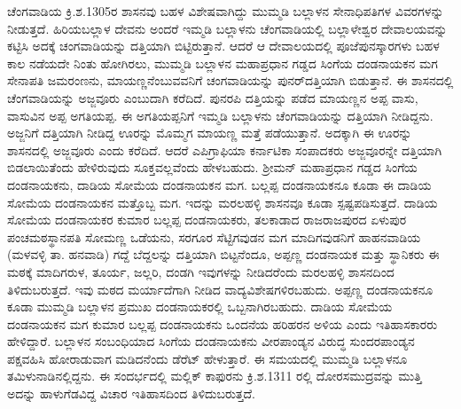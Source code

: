 ಚೆಂಗವಾಡಿಯ ಕ್ರಿ.ಶ.1305ರ ಶಾಸನವು ಬಹಳ ವಿಶೇಷವಾಗಿದ್ದು ಮುಮ್ಮಡಿ ಬಲ್ಲಾಳನ ಸೇನಾಧಿಪತಿಗಳ ವಿವರಗಳನ್ನು ನೀಡುತ್ತದೆ. ಹಿರಿಯಬಲ್ಲಾಳ ದೇವನು ಅಂದರೆ ಇಮ್ಮಡಿ ಬಲ್ಲಾಳನು ಚೆಂಗವಾಡಿಯಲ್ಲಿ ಬಲ್ಲಾಳೇಶ್ವರ ದೇವಾಲಯವನ್ನು ಕಟ್ಟಿಸಿ ಅದಕ್ಕೆ ಚಂಗವಾಡಿಯನ್ನು ದತ್ತಿಯಾಗಿ ಬಿಟ್ಟಿರುತ್ತಾನೆ. ಆದರೆ ಆ ದೇವಾಲಯದಲ್ಲಿ ಪೂಜೆಪುನಸ್ಕಾರಗಳು ಬಹಳ ಕಾಲ ನಡೆಯದೇ ನಿಂತು ಹೋಗಿರಲು, ಮುಮ್ಮಡಿ ಬಲ್ಲಾಳನ ಮಹಾಪ್ರಧಾನ ಗಡ್ಡದ ಸಿಂಗೆಯ ದಂಡನಾಯಕನ ಮಗ ಸೇನಾಪತಿ ಜಮರಂಣನು, ಮಾಯಣ್ಣನೆಂಬುವವನಿಗೆ ಚಂಗವಾಡಿಯನ್ನು ಪುನರ್​ದತ್ತಿಯಾಗಿ ಬಿಡುತ್ತಾನೆ. ಈ ಶಾಸನದಲ್ಲಿ ಚೆಂಗವಾಡಿಯನ್ನು ಅಜ್ಜವೂರು ಎಂಬುದಾಗಿ ಕರೆದಿದೆ. ಪುನರಪಿ ದತ್ತಿಯನ್ನು ಪಡೆದ ಮಾಯಣ್ಣನ ಅಪ್ಪ ವಾಸು, ವಾಸುವಿನ ಅಪ್ಪ ಅಗತಿಯಪ್ಪ. ಈ ಅಗತಿಯಪ್ಪನಿಗೆ ಇಮ್ಮಡಿ ಬಲ್ಲಾಳನು ಚೆಂಗವಾಡಿಯನ್ನು ದತ್ತಿಯಾಗಿ ನೀಡಿದ್ದನು. ಅಜ್ಜನಿಗೆ ದತ್ತಿಯಾಗಿ ನೀಡಿದ್ದ ಊರನ್ನು ಮೊಮ್ಮಗ ಮಾಯಣ್ಣ ಮತ್ತೆ ಪಡೆಯುತ್ತಾನೆ. ಅದಕ್ಕಾಗಿ ಈ ಊರನ್ನು ಶಾಸನದಲ್ಲಿ ಅಜ್ಜವೂರು ಎಂದು ಕರೆದಿದೆ. ಆದರೆ ಎಪಿಗ್ರಾಫಿಯಾ ಕರ್ನಾಟಿಕಾ ಸಂಪಾದಕರು ಅಜ್ಜವೂರನ್ನೇ ದತ್ತಿಯಾಗಿ ಬಿಡಲಾಯಿತೆಂದು ಹೇಳಿರುವುದು ಸೂಕ್ತವಲ್ಲವೆಂದು ಹೇಳಬಹುದು. ಶ‍್ರೀಮನ್​ ಮಹಾಪ್ರಧಾನ ಗಡ್ಡದ ಸಿಂಗೆಯ ದಂಡನಾಯಕನು, ದಾಡಿಯ ಸೋಮೆಯ ದಂಡನಾಯಕನ ಮಗ. ಬಲ್ಲಪ್ಪ ದಂಡನಾಯಕನೂ ಕೂಡಾ ಈ ದಾಡಿಯ ಸೋಮೆಯ ದಂಡನಾಯಕನ ಮತ್ತೊಬ್ಬ ಮಗ. ಇದನ್ನು ಮರಲಹಳ್ಳಿ ಶಾಸನವೂ ಕೂಡಾ ಸ್ಪಷ್ಟಪಡಿಸುತ್ತದೆ. ದಾಡಿಯ ಸೋಮೆಯ ದಂಡನಾಯಕರ ಕುಮಾರ ಬಲ್ಲಪ್ಪ ದಂಡನಾಯಕರು, ತಲಕಾಡಾದ ರಾಜರಾಜಪುರದ ಏಳುಪುರ ಪಂಚಮಠಸ್ಥಾನಪತಿ ಸೋಮಣ್ಣ ಒಡೆಯನು, ಸರಗೂರ ಸೆಟ್ಟಿಗವುಡನ ಮಗ ಮಾದಿಗವುಡನಿಗೆ ಹಾಹನವಾಡಿಯ (ಮಳವಳ್ಳಿ ತಾ. ಹನವಾಡಿ) ಗದ್ದೆ ಬೆದ್ದಲನ್ನು ದತ್ತಿಯಾಗಿ ಬಿಟ್ಟನೆಂದೂ, ಅಪ್ಪಣ್ಣ ದಂಡನಾಯಕ ಮತ್ತು ಸ್ಥಾನಿಕರು ಈ ಮಠಕ್ಕೆ ಮಾದಿಗರುಳ, ತೂರ್ಯ, ಜಲ್ಲರಿ, ದಂಡಗಿ ಇವುಗಳನ್ನು ನೀಡಿದರೆಂದು ಮರಲಹಳ್ಳಿ ಶಾಸನದಿಂದ ತಿಳಿದುಬರುತ್ತದೆ. ಇವು ಮಠದ ಮರ್ಯಾದೆಗಾಗಿ ನೀಡಿದ ವಾದ್ಯವಿಶೇಷಗಳಿರಬಹುದು. ಅಪ್ಪಣ್ಣ ದಂಡನಾಯಕನೂ ಕೂಡಾ ಮುಮ್ಮಡಿ ಬಲ್ಲಾಳನ ಪ್ರಮುಖ ದಂಡನಾಯಕರಲ್ಲಿ ಒಬ್ಬನಾಗಿರಬಹುದು. ದಾಡಿಯ ಸೋಮೆಯ ದಂಡನಾಯಕನ ಮಗ ಕುಮಾರ ಬಲ್ಲಪ್ಪ ದಂಡನಾಯಕನು ಒಂದನೆಯ ಹರಿಹರನ ಅಳಿಯ ಎಂದು ಇತಿಹಾಸಕಾರರು ಹೇಳಿದ್ದಾರೆ. ಬಲ್ಲಾಳನ ಸಂಬಂಧಿಯಾದ ಸಿಂಗೆಯ ದಂಡನಾಯಕನು ವೀರಪಾಂಡ್ಯನ ವಿರುದ್ಧ ಸುಂದರಪಾಂಡ್ಯನ ಪಕ್ಷವಹಿಸಿ ಹೋರಾಡುವಾಗ ಮಡಿದನೆಂದು ಡೆರೆಟ್​ ಹೇಳುತ್ತಾರೆ. ಈ ಸಮಯದಲ್ಲಿ ಮುಮ್ಮಡಿ ಬಲ್ಲಾಳನೂ ತಮಿಳುನಾಡಿನಲ್ಲಿದ್ದನು. ಈ ಸಂದರ್ಭದಲ್ಲಿ ಮಲ್ಲಿಕ್​ ಕಾಫುರನು ಕ್ರಿ.ಶ.1311 ರಲ್ಲಿ ದೋರಸಮುದ್ರವನ್ನು ಮುತ್ತಿ ಅದನ್ನು ಹಾಳುಗೆಡವಿದ್ದ ವಿಚಾರ ಇತಿಹಾಸದಿಂದ ತಿಳಿದುಬರುತ್ತದೆ.

